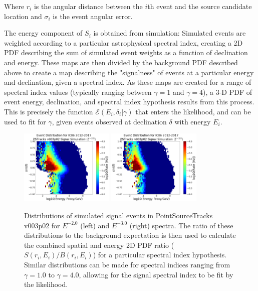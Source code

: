 Where $r_i$ is the angular distance between the $i$th event and the source candidate location and $\sigma_i$ is the event angular error.  

The energy component of $S_i$ is obtained from simulation: Simulated events are weighted according to a particular astrophysical spectral index, creating a 2D PDF describing the sum of simulated event weights as a function of declination and energy. These maps are then divided by the background PDF described above to create a map describing the "signalness" of events at a particular energy and declination, given a spectral index. As these maps are created for a range of spectral index values (typically ranging between $\gamma=1$ and $\gamma=4$), a 3-D PDF of event energy, declination, and spectral index hypothesis results from this process. This is precisely the function $\mathcal{E}(E_i, \delta_i|\gamma)$ that enters the likelihood, and can be used to fit for $\gamma$, given events observed at declination $\delta$ with energy $E_i$.  

\begin{figure}[h]
\centering
\includegraphics[width=0.4\textwidth]{figs/sigsimgam2.png}
\includegraphics[width=0.4\textwidth]{figs/sigsimgam3.png}
\caption{Distributions of simulated signal events in PointSourceTracks v003p02 for $E^{-2.0}$ (left) and $E^{-3.0}$ (right) spectra. The ratio of these distributions to the background expectation is then used to calculate the combined spatial and energy 2D PDF ratio ($S(r_i, E_i)/B(r_i, E_i)$) for a particular spectral index hypothesis. Similar distributions can be made for spectral indices ranging from $\gamma=1.0$ to $\gamma=4.0$, allowing for the signal spectral index to be fit by the likelihood.}
\label{fig:SigPDf}
\end{figure}

